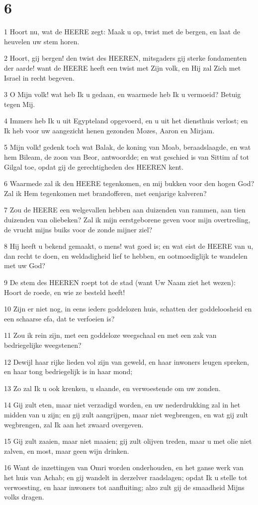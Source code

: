 \chapter{6}

\par 1 Hoort nu, wat de HEERE zegt: Maak u op, twist met de bergen, en laat de heuvelen uw stem horen.
\par 2 Hoort, gij bergen! den twist des HEEREN, mitsgaders gij sterke fondamenten der aarde! want de HEERE heeft een twist met Zijn volk, en Hij zal Zich met Israel in recht begeven.
\par 3 O Mijn volk! wat heb Ik u gedaan, en waarmede heb Ik u vermoeid? Betuig tegen Mij.
\par 4 Immers heb Ik u uit Egypteland opgevoerd, en u uit het diensthuis verlost; en Ik heb voor uw aangezicht henen gezonden Mozes, Aaron en Mirjam.
\par 5 Mijn volk! gedenk toch wat Balak, de koning van Moab, beraadslaagde, en wat hem Bileam, de zoon van Beor, antwoordde; en wat geschied is van Sittim af tot Gilgal toe, opdat gij de gerechtigheden des HEEREN kent.
\par 6 Waarmede zal ik den HEERE tegenkomen, en mij bukken voor den hogen God? Zal ik Hem tegenkomen met brandofferen, met eenjarige kalveren?
\par 7 Zou de HEERE een welgevallen hebben aan duizenden van rammen, aan tien duizenden van oliebeken? Zal ik mijn eerstgeborene geven voor mijn overtreding, de vrucht mijns buiks voor de zonde mijner ziel?
\par 8 Hij heeft u bekend gemaakt, o mens! wat goed is; en wat eist de HEERE van u, dan recht te doen, en weldadigheid lief te hebben, en ootmoediglijk te wandelen met uw God?
\par 9 De stem des HEEREN roept tot de stad (want Uw Naam ziet het wezen): Hoort de roede, en wie ze besteld heeft!
\par 10 Zijn er niet nog, in eens ieders goddelozen huis, schatten der goddeloosheid en een schaarse efa, dat te verfoeien is?
\par 11 Zou ik rein zijn, met een goddeloze weegschaal en met een zak van bedriegelijke weegstenen?
\par 12 Dewijl haar rijke lieden vol zijn van geweld, en haar inwoners leugen spreken, en haar tong bedriegelijk is in haar mond;
\par 13 Zo zal Ik u ook krenken, u slaande, en verwoestende om uw zonden.
\par 14 Gij zult eten, maar niet verzadigd worden, en uw nederdrukking zal in het midden van u zijn; en gij zult aangrijpen, maar niet wegbrengen, en wat gij zult wegbrengen, zal Ik aan het zwaard overgeven.
\par 15 Gij zult zaaien, maar niet maaien; gij zult olijven treden, maar u met olie niet zalven, en most, maar geen wijn drinken.
\par 16 Want de inzettingen van Omri worden onderhouden, en het ganse werk van het huis van Achab; en gij wandelt in derzelver raadslagen; opdat Ik u stelle tot verwoesting, en haar inwoners tot aanfluiting; alzo zult gij de smaadheid Mijns volks dragen.

